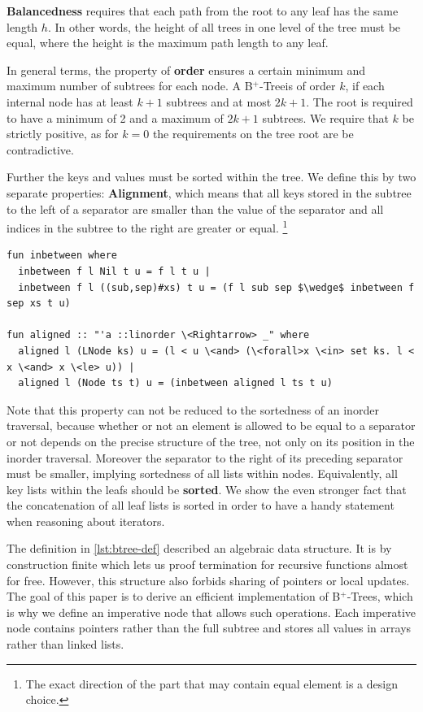 \documentclass[a4paper,UKenglish,cleveref, autoref, thm-restate]{lipics-v2021}
\newcommand{\btree}{B$^+$-Tree}
\newcommand{\btrees}{B$^+$-Trees}
\begin{document}
\textbf{Balancedness} requires
that each path from the root to any leaf has the same length $h$.
In other words, the height of all trees in one level of the tree must be equal,
where the height is the maximum path length to any leaf.

In general terms, the property of \textbf{order} ensures a certain minimum and maximum
number of subtrees for each node.
A \btree is of order $k$, if each internal node has at least $k+1$
subtrees and at most $2k+1$.
The root is required to have a minimum of 2 and a maximum of $2k+1$ subtrees.
We require that $k$ be strictly positive, as for $k = 0$ the requirements on the tree
root are be contradictive.

Further the keys and values must be sorted within the tree.
We define this by two separate properties: \textbf{Alignment}, which means that all keys stored
in the subtree to the left of a separator are smaller than the value of the separator
and all indices in the subtree to the right are greater or equal.
\footnote{
    The exact direction of the part that may contain equal element is a design choice.
}
\begin{lstlisting}[mathescape=true, language=Isabelle,label=lst:btree-alignment-def]
fun inbetween where
  inbetween f l Nil t u = f l t u |
  inbetween f l ((sub,sep)#xs) t u = (f l sub sep $\wedge$ inbetween f sep xs t u)

fun aligned :: "'a ::linorder \<Rightarrow> _" where
  aligned l (LNode ks) u = (l < u \<and> (\<forall>x \<in> set ks. l < x \<and> x \<le> u)) |
  aligned l (Node ts t) u = (inbetween aligned l ts t u)
\end{lstlisting}


Note that this property can not be reduced to the sortedness of an inorder traversal,
because whether or not an element is allowed to be equal to a separator or not
depends on the precise structure of the tree, not only on its position in the inorder traversal.
Moreover the separator to the right of its preceding separator must be smaller,
implying sortedness of all lists within nodes.
Equivalently, all key lists within the leafs should be \textbf{sorted}.
We show the even stronger fact that the concatenation of all leaf lists
is sorted in order to have a handy statement when reasoning about iterators.

The definition in \autoref{lst:btree-def} described an algebraic data structure.
It is by construction finite which lets us proof termination for recursive functions almost for free.
However, this structure also forbids sharing of pointers or local updates.
The goal of this paper is to derive an efficient implementation
of \btrees, which is why we define an imperative node that allows such operations.
Each imperative node contains pointers rather than the full subtree and
stores all values in arrays rather than linked lists.
\end{document}
